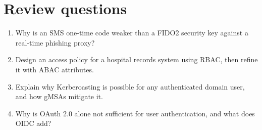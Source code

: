 \section*{Review questions}
\begin{enumerate}
  \item Why is an SMS one-time code weaker than a FIDO2 security key against a real-time phishing proxy?
  \item Design an access policy for a hospital records system using RBAC, then refine it with ABAC attributes.
  \item Explain why Kerberoasting is possible for any authenticated domain user, and how gMSAs mitigate it.
  \item Why is OAuth 2.0 alone not sufficient for user authentication, and what does OIDC add?
\end{enumerate}
